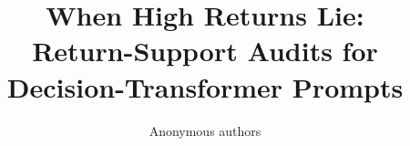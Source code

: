 \documentclass{article}
\title{When High Returns Lie:\\Return-Support Audits for\\Decision-Transformer Prompts}
\author{Anonymous authors}
\begin{document}
\maketitle

\begin{abstract}

\end{abstract}












\appendix

\end{document}

